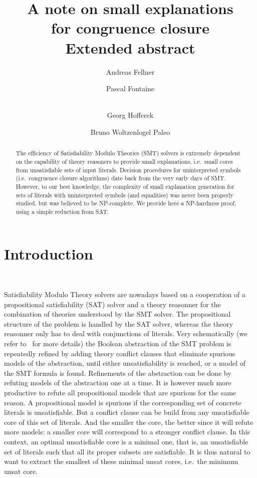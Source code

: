 \documentclass{easychair}
\title{A note on small explanations\\ for congruence closure\\\small Extended abstract}
\author{Andreas Fellner\inst{1}
   \and Pascal Fontaine\inst{3}
   \and\\ Georg Hofferek
   \and Bruno Woltzenlogel Paleo
}
\institute{ ****
\and ***
\and Inria, Loria, U. of Lorraine (France)}
\begin{document}
\maketitle

\begin{abstract}
The efficiency of Satisfiability Modulo Theories (SMT) solvers is extremely
dependent on the capability of theory reasoners to provide small explanations,
i.e.\ small cores from unsatisfiable sets of input literals.  Decision
procedures for uninterpreted symbols (i.e.\ congruence closure algorithms) date
back from the very early days of SMT.  However, to our best knowledge, the
complexity of small explanation generation for sets of literals with
uninterpreted symbols (and equalities) was never been properly studied, but was believed to be NP-complete.  We provide here a NP-hardness proof, using a
simple reduction from SAT.
\end{abstract}


\section*{Introduction}

~\cite{Nelson2}
~\cite{Downey1}
~\cite{Nieuwenhuis3}
~\cite{Nieuwenhuis6}
~\cite{Nieuwenhuis8}
~\cite{Nieuwenhuis9}

Satisfiability Modulo Theory solvers are nowadays based on a cooperation of a
propositional satisfiability (SAT) solver and a theory reasonner for the
combination of theories understood by the SMT solver.  The propositional
structure of the problem is handled by the SAT solver, whereas the theory
reasonner only has to deal with conjunctions of literals.  Very schematically
(we refer to~\cite{Barrett14} for more details) the Boolean abstraction of the
SMT problem is repeatedly refined by adding theory conflict clauses that
eliminate spurious models of the abstraction, until either unsatisfiability is
reached, or a model of the SMT formula is found.  Refinements of the abstraction
can be done by refuting models of the abstraction one at a time.  It is however
much more productive to refute all propositional models that are spurious for
the same reason.  A propositional model is spurious if the corresponding set of
concrete literals is unsatisfiable.  But a conflict clause can be build from any
unsatisfiable core of this set of literals.  And the smaller the core, the
better since it will refute more models: a smaller core will correspond to a
stronger conflict clause.  In this context, an optimal unsatisfiable core is a
minimal one, that is, an unsatisfiable set of literals such that all its proper
subsets are satisfiable.  It is thus natural to want to extract the smallest of
these minimal unsat cores, i.e.\ the minimum unsat core.
\end{document}
